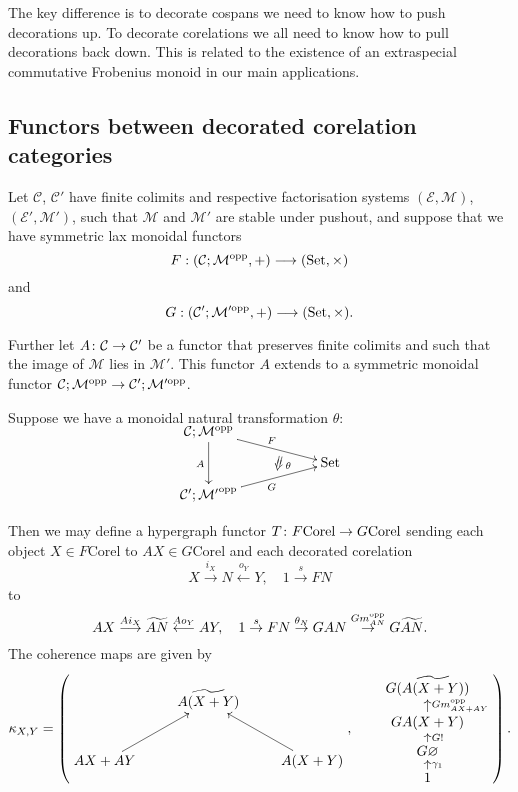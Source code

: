 The key difference is to decorate cospans we need to know how to push
decorations up. To decorate corelations we all need to know how to pull
decorations back down. This is related to the existence of an extraspecial
commutative Frobenius monoid in our main applications.

\subsection{Functors between decorated corelation categories}

\begin{proposition}\label{prop.deccorelfunctors}
  Let $\mathcal C$, $\mathcal C'$ have finite colimits and respective
factorisation systems $(\mathcal E, \mathcal M)$, $(\mathcal E', \mathcal M')$,
such that $\mathcal M$ and $\mathcal M'$ are stable under pushout, and suppose
that we have symmetric lax monoidal functors
\[
  F: (\mathcal C;\mathcal M^{\mathrm{opp}},+) \longrightarrow (\mathrm{Set}, \times)
\]
and
\[
  G: (\mathcal C';\mathcal M'^{\mathrm{opp}},+) \longrightarrow (\mathrm{Set}, \times).
\]

Further let $A{\colon} \mathcal C \to \mathcal C'$ be a functor that preserves
finite colimits and such that the image of $\mathcal M$ lies in $\mathcal M'$.
This functor $A$ extends to a symmetric monoidal functor $\mathcal C;\mathcal M^{\mathrm{opp}} \to
\mathcal C';\mathcal M'^{\mathrm{opp}}$.

Suppose we have a monoidal natural transformation $\theta$:
\[
  \xymatrixrowsep{2ex}
  \xymatrix{
    \mc C; \mc M^\opp \ar[dd]_{A} \ar[drr]^F  \\
    &\twocell \omit{_\:\theta}& \Set \\
    \mc C'; \mc {M'}^\opp \ar[urr]_{G} 
  }
\]

Then we may define a hypergraph functor $T{\colon} F\mathrm{Corel} \to
G\mathrm{Corel}$ sending each object $X \in F\mathrm{Corel}$ to $AX \in
G\mathrm{Corel}$ and each decorated corelation 
\[
  X \stackrel{i_X}{\longrightarrow} N \stackrel{o_Y}{\longleftarrow} Y, \quad
  1 \stackrel{s}{\to} FN
\]
to
\[
  AX \stackrel{Ai_X}{\longrightarrow} \widetilde{AN} \stackrel{Ao_Y}{\longleftarrow} AY,
  \quad 1 \stackrel{s}{\to} FN \stackrel{\theta_N}{\to} GAN
  \stackrel{Gm_{AN}^{\mathrm{opp}}}{\to} G\widetilde{AN}.	
\]
The coherence maps are given by
\[
  \kappa_{X,Y}=          
  \left(
  \begin{aligned}
    \xymatrix{
      & \widetilde{A(X+Y)} \\  
      AX+AY \ar[ur] && A(X+Y) \ar[ul]
    }
  \end{aligned}
  ,
  \qquad
  \begin{aligned}
    \xymatrixrowsep{1.4ex}
    \xymatrix{
      G(\widetilde{A(X+Y)}) \\
      GA(X+Y) \ar[u]_{Gm_{AX+AY}^\opp} \\
      G\varnothing \ar[u]_{G!} \\
      1 \ar[u]_{\gamma_1}
    }
  \end{aligned}
  \right).
\]
\end{proposition}
